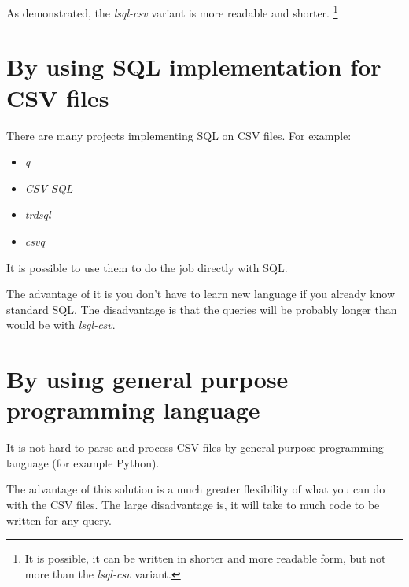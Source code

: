 As demonstrated, the \textit{lsql-csv} variant is more readable and shorter. 
\footnote{It is possible, it can be written in shorter and more readable form, but not more than the \textit{lsql-csv} variant.}

\section{By using SQL implementation for CSV files}
There are many projects implementing SQL on CSV files. For example:
\begin{itemize}
    \item \textit{q} \cite{q}
    \item \textit{CSV SQL} \cite{csv-sql} 
    \item \textit{trdsql} \cite{trdsql}
    \item \textit{csvq} \cite{csvq}
\end{itemize}

It is possible to use them to do the job directly with SQL. 

The advantage of it is you don't have to learn new language if you already know standard SQL. 
The disadvantage is that the queries will be probably longer than would be with \textit{lsql-csv}.

\section{By using general purpose programming language}
It is not hard to parse and process CSV files by general purpose programming language (for example Python).

The advantage of this solution is a much greater flexibility of what you can do with the CSV files.
The large disadvantage is, it will take to much code to be written for any query.

